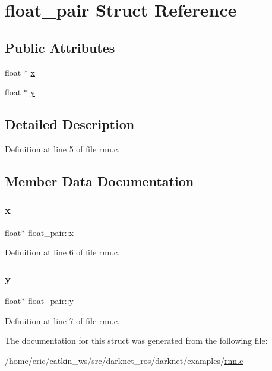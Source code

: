\hypertarget{structfloat__pair}{}\section{float\+\_\+pair Struct Reference}
\label{structfloat__pair}
\subsection*{Public Attributes}
\begin{DoxyCompactItemize}
\item 
float $\ast$ \mbox{\hyperlink{structfloat__pair_ae6eee479583279eca5354fcb97c655fc}{x}}
\item 
float $\ast$ \mbox{\hyperlink{structfloat__pair_a79e3fd0099b0139bfebf603277443f96}{y}}
\end{DoxyCompactItemize}


\subsection{Detailed Description}


Definition at line 5 of file rnn.\+c.



\subsection{Member Data Documentation}
\mbox{\label{structfloat__pair_ae6eee479583279eca5354fcb97c655fc}} 
\subsubsection{\texorpdfstring{x}{x}}
{\footnotesize\ttfamily float$\ast$ float\+\_\+pair\+::x}



Definition at line 6 of file rnn.\+c.

\mbox{\label{structfloat__pair_a79e3fd0099b0139bfebf603277443f96}} 
\subsubsection{\texorpdfstring{y}{y}}
{\footnotesize\ttfamily float$\ast$ float\+\_\+pair\+::y}



Definition at line 7 of file rnn.\+c.



The documentation for this struct was generated from the following file\+:\begin{DoxyCompactItemize}
\item 
/home/eric/catkin\+\_\+ws/src/darknet\+\_\+ros/darknet/examples/\mbox{\hyperlink{rnn_8c}{rnn.\+c}}\end{DoxyCompactItemize}
